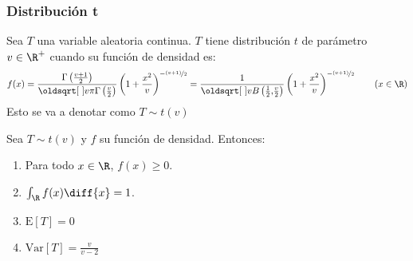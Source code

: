 \subsubsection{Distribución t}
\begin{Def}
    Sea $T$ una variable aleatoria continua. $T$ tiene distribución $t$
    de parámetro $v \in \R^+$ cuando su función de densidad es:
    \[
        f(x)=\frac{\Gamma\left(\frac{v+1}{2}\right)}
        {\sqrt{v\pi}\Gamma\left(\frac{v}{2}\right)}
        \left(1+\frac{x^2}{v}\right)^{-\nicefrac{(v+1)}{2}}
        =
        \frac{1}{\sqrt{v}B\left(\frac{1}{2}\text{,}\frac{v}{2}\right)}
        \left(1+\frac{x^2}{v}\right)^{-\nicefrac{(v+1)}{2}}
        \qquad (x \in \R)
    \]
    Esto se va a denotar como $T\sim t(v)$
\end{Def}
\begin{Teo}
    Sea $T\sim t(v)$ y $f$ su función de densidad. Entonces:
    \begin{enumerate}
        \item Para todo $x\in\R$, $f(x) \geq 0$.
        \item $\int_{\R}f(x)\diff{x}=1$.
        \item $\text{E}[T]=0$
        \item $\text{Var}[T]=\frac{v}{v-2}$
    \end{enumerate}
\end{Teo}
